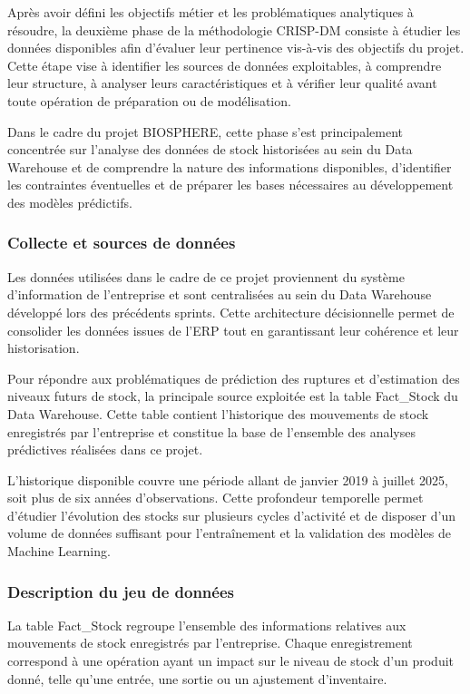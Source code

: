 Après avoir défini les objectifs métier et les problématiques analytiques à résoudre, la deuxième phase de la méthodologie CRISP-DM consiste à étudier les données disponibles afin d'évaluer leur pertinence vis-à-vis des objectifs du projet. Cette étape vise à identifier les sources de données exploitables, à comprendre leur structure, à analyser leurs caractéristiques et à vérifier leur qualité avant toute opération de préparation ou de modélisation.
 
Dans le cadre du projet BIOSPHERE, cette phase s'est principalement concentrée sur l'analyse des données de stock historisées au sein du Data Warehouse et de comprendre la nature des informations disponibles, d'identifier les contraintes éventuelles et de préparer les bases nécessaires au développement des modèles prédictifs.
 
\subsubsection{Collecte et sources de données}
 
Les données utilisées dans le cadre de ce projet proviennent du système d'information de l'entreprise et sont centralisées au sein du Data Warehouse développé lors des précédents sprints. Cette architecture décisionnelle permet de consolider les données issues de l'ERP tout en garantissant leur cohérence et leur historisation.
 
Pour répondre aux problématiques de prédiction des ruptures et d'estimation des niveaux futurs de stock, la principale source exploitée est la table Fact\_Stock du Data Warehouse. Cette table contient l'historique des mouvements de stock enregistrés par l'entreprise et constitue la base de l'ensemble des analyses prédictives réalisées dans ce projet.
 
L'historique disponible couvre une période allant de janvier 2019 à juillet 2025, soit plus de six années d'observations. Cette profondeur temporelle permet d'étudier l'évolution des stocks sur plusieurs cycles d'activité et de disposer d'un volume de données suffisant pour l'entraînement et la validation des modèles de Machine Learning.
 
\subsubsection{Description du jeu de données}
 
La table Fact\_Stock regroupe l'ensemble des informations relatives aux mouvements de stock enregistrés par l'entreprise. Chaque enregistrement correspond à une opération ayant un impact sur le niveau de stock d'un produit donné, telle qu'une entrée, une sortie ou un ajustement d'inventaire.
 
